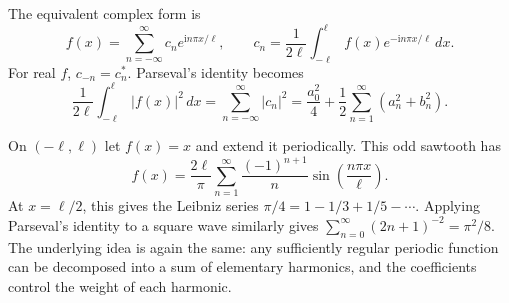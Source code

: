 The equivalent complex form is
\begin{equation}
f(x)=\sum_{n=-\infty}^{\infty}c_ne^{\mathrm{i}n\pi x/\ell},
\qquad c_n=\frac{1}{2\ell}\int_{-\ell}^{\ell}f(x)e^{-\mathrm{i}n\pi x/\ell}\,dx.
\end{equation}
For real $f$, $c_{-n}=c_n^*$. Parseval's identity becomes
\begin{equation}
\frac{1}{2\ell}\int_{-\ell}^{\ell}|f(x)|^2\,dx=\sum_{n=-\infty}^{\infty}|c_n|^2
=\frac{a_0^2}{4}+\frac12\sum_{n=1}^{\infty}(a_n^2+b_n^2).
\end{equation}

\begin{example}
On $(-\ell,\ell)$ let $f(x)=x$ and extend it periodically. This odd sawtooth has
\begin{equation}
f(x)=\frac{2\ell}{\pi}\sum_{n=1}^{\infty}
\frac{(-1)^{n+1}}{n}\sin\left(\frac{n\pi x}{\ell}\right).
\end{equation}
At $x=\ell/2$, this gives the Leibniz series $\pi/4=1-1/3+1/5-\cdots$. Applying Parseval's identity to a square wave similarly gives $\sum_{n=0}^{\infty}(2n+1)^{-2}=\pi^2/8$. The underlying idea is again the same: any sufficiently regular periodic function can be decomposed into a sum of elementary harmonics, and the coefficients control the weight of each harmonic.
\end{example}

